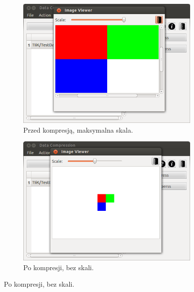 \documentclass[12pt,a4paper,notitlepage]{report}
\begin{document}
\begin{figure}[H]
\begin{subfigure}{0.45\textwidth}
		\includegraphics[scale=.4]{imageviewer_max}
		\caption{Przed kompresją, maksymalna skala.}
	\end{subfigure}\hfill
	\begin{subfigure}{0.45\textwidth}
		\centering
		\includegraphics[scale=.4]{imageviewer_com}
		\caption{Po kompresji, bez skali.}
	\end{subfigure}
\end{figure}
\end{document}
